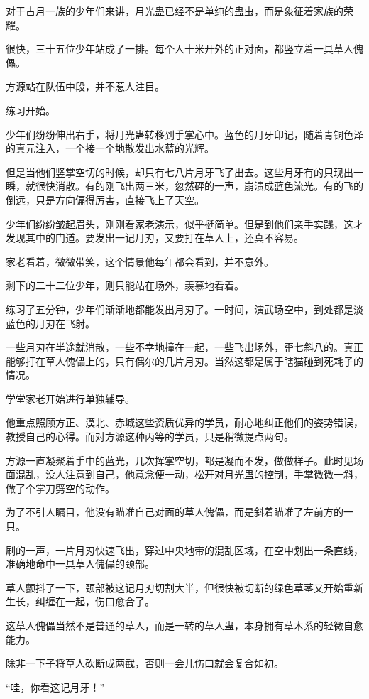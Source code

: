 \begin{this_body}
对于古月一族的少年们来讲，月光蛊已经不是单纯的蛊虫，而是象征着家族的荣耀。

很快，三十五位少年站成了一排。每个人十米开外的正对面，都竖立着一具草人傀儡。

方源站在队伍中段，并不惹人注目。

练习开始。

少年们纷纷伸出右手，将月光蛊转移到手掌心中。蓝色的月牙印记，随着青铜色泽的真元注入，一个接一个地散发出水蓝的光辉。

但是当他们竖掌空切的时候，却只有七八片月牙飞了出去。这些月牙有的只现出一瞬，就很快消散。有的刚飞出两三米，忽然砰的一声，崩溃成蓝色流光。有的飞的倒远，只是方向偏得厉害，直接飞上了天空。

少年们纷纷皱起眉头，刚刚看家老演示，似乎挺简单。但是到他们亲手实践，这才发现其中的门道。要发出一记月刃，又要打在草人上，还真不容易。

家老看着，微微带笑，这个情景他每年都会看到，并不意外。

剩下的二十二位少年，则只能站在场外，羡慕地看着。

练习了五分钟，少年们渐渐地都能发出月刃了。一时间，演武场空中，到处都是淡蓝色的月刃在飞射。

一些月刃在半途就消散，一些不幸地撞在一起，一些飞出场外，歪七斜八的。真正能够打在草人傀儡上的，只有偶尔的几片月刃。当然这都是属于瞎猫碰到死耗子的情况。

学堂家老开始进行单独辅导。

他重点照顾方正、漠北、赤城这些资质优异的学员，耐心地纠正他们的姿势错误，教授自己的心得。而对方源这种丙等的学员，只是稍微提点两句。

方源一直凝聚着手中的蓝光，几次挥掌空切，都是凝而不发，做做样子。此时见场面混乱，没人注意到自己，他意念便一动，松开对月光蛊的控制，手掌微微一斜，做了个掌刀劈空的动作。

为了不引人瞩目，他没有瞄准自己对面的草人傀儡，而是斜着瞄准了左前方的一只。

刷的一声，一片月刃快速飞出，穿过中央地带的混乱区域，在空中划出一条直线，准确地命中一具草人傀儡的颈部。

草人颤抖了一下，颈部被这记月刃切割大半，但很快被切断的绿色草茎又开始重新生长，纠缠在一起，伤口愈合了。

这草人傀儡当然不是普通的草人，而是一转的草人蛊，本身拥有草木系的轻微自愈能力。

除非一下子将草人砍断成两截，否则一会儿伤口就会复合如初。

“哇，你看这记月牙！”


\end{this_body}
